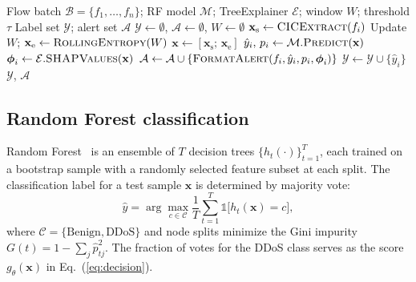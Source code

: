 \documentclass{ieeeaccess}
\begin{document}
\begin{algorithm}[!t]
\caption{XAI-SDN real-time detection and explanation}
\label{alg:xaisdn}
\begin{algorithmic}[1]
\Require Flow batch $\mathcal{B}=\{f_1,\ldots,f_n\}$; RF model $\mathcal{M}$; TreeExplainer $\mathcal{E}$; window $W$; threshold $\tau$
\Ensure Label set $\mathcal{Y}$; alert set $\mathcal{A}$
\State $\mathcal{Y}\leftarrow\emptyset$,\; $\mathcal{A}\leftarrow\emptyset$,\; $W\leftarrow\emptyset$
\State $\mathbf{x}_{\mathrm{s}} \leftarrow \textsc{CICExtract}(f_i)$ 
\State Update $W$;\; $\mathbf{x}_{\mathrm{e}} \leftarrow \textsc{RollingEntropy}(W)$ 
\State $\mathbf{x} \leftarrow [\mathbf{x}_{\mathrm{s}};\, \mathbf{x}_{\mathrm{e}}]$ 
\State $\hat{y}_i,\, p_i \leftarrow \mathcal{M}.\textsc{Predict}(\mathbf{x})$ 
\State $\boldsymbol{\phi}_i \leftarrow \mathcal{E}.\textsc{SHAPValues}(\mathbf{x})$ 
\State $\mathcal{A}\leftarrow\mathcal{A}\cup\{\textsc{FormatAlert}(f_i,\hat{y}_i,p_i,\boldsymbol{\phi}_i)\}$
\EndIf
\State $\mathcal{Y}\leftarrow\mathcal{Y}\cup\{\hat{y}_i\}$
\EndFor
\State \Return $\mathcal{Y}$,\; $\mathcal{A}$
\end{algorithmic}
\end{algorithm}

\subsection{Random Forest classification}
Random Forest~\cite{breiman2001rf} is an ensemble of $T$ decision trees $\{h_t(\cdot)\}_{t=1}^{T}$, each trained on a bootstrap sample with a randomly selected feature subset at each split. The classification label for a test sample $\mathbf{x}$ is determined by majority vote:
\begin{equation}
\hat{y} = \arg\max_{c \in \mathcal{C}} \frac{1}{T} \sum_{t=1}^{T} \mathbb{1}\bigl[h_t(\mathbf{x}) = c\bigr],
\label{eq:rfpred}
\end{equation}
where $\mathcal{C} = \{\text{Benign}, \text{DDoS}\}$ and node splits minimize the Gini impurity $G(t) = 1 - \sum_{j} \hat{p}_{tj}^{2}$. The fraction of votes for the DDoS class serves as the score $g_{\theta}(\mathbf{x})$ in Eq.~(\ref{eq:decision}).
\end{document}
